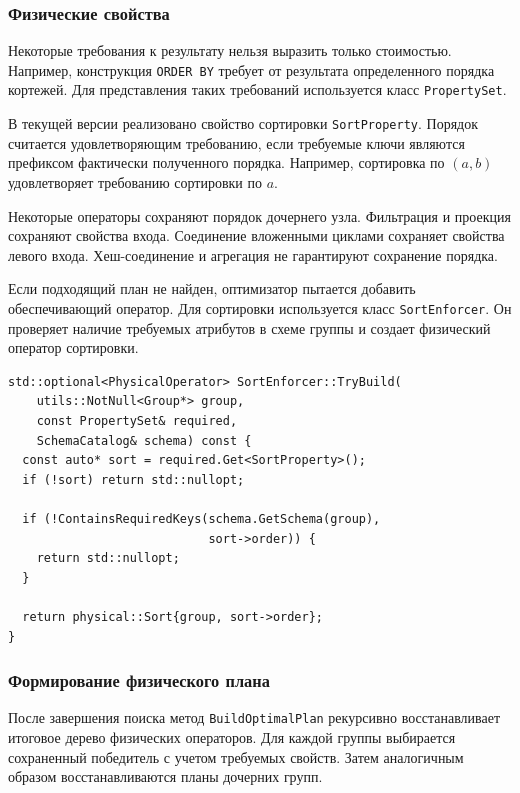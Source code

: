 \documentclass[fontsize=14pt, russian]{scrartcl}
\begin{document}
\subsubsection{Физические свойства}

Некоторые требования к результату нельзя выразить только стоимостью. Например,
конструкция \verb|ORDER BY| требует от результата определенного порядка
кортежей. Для представления таких требований используется класс
\verb|PropertySet|.

В текущей версии реализовано свойство сортировки \verb|SortProperty|. Порядок
считается удовлетворяющим требованию, если требуемые ключи являются префиксом
фактически полученного порядка. Например, сортировка по $(a, b)$ удовлетворяет
требованию сортировки по $a$.

Некоторые операторы сохраняют порядок дочернего узла. Фильтрация и проекция
сохраняют свойства входа. Соединение вложенными циклами сохраняет свойства
левого входа. Хеш-соединение и агрегация не гарантируют сохранение порядка.

Если подходящий план не найден, оптимизатор пытается добавить обеспечивающий
оператор. Для сортировки используется класс \verb|SortEnforcer|. Он проверяет
наличие требуемых атрибутов в схеме группы и создает физический оператор
сортировки.

\begin{listing}[H]
  \caption{Добавление оператора сортировки для обеспечения свойства.}
  \label{lst:sort-enforcer}
  \begin{verbatim}
std::optional<PhysicalOperator> SortEnforcer::TryBuild(
    utils::NotNull<Group*> group,
    const PropertySet& required,
    SchemaCatalog& schema) const {
  const auto* sort = required.Get<SortProperty>();
  if (!sort) return std::nullopt;

  if (!ContainsRequiredKeys(schema.GetSchema(group),
                            sort->order)) {
    return std::nullopt;
  }

  return physical::Sort{group, sort->order};
}
  \end{verbatim}
\end{listing}

\subsubsection{Формирование физического плана}

После завершения поиска метод \verb|BuildOptimalPlan| рекурсивно восстанавливает
итоговое дерево физических операторов. Для каждой группы выбирается сохраненный
победитель с учетом требуемых свойств. Затем аналогичным образом
восстанавливаются планы дочерних групп.
\end{document}
